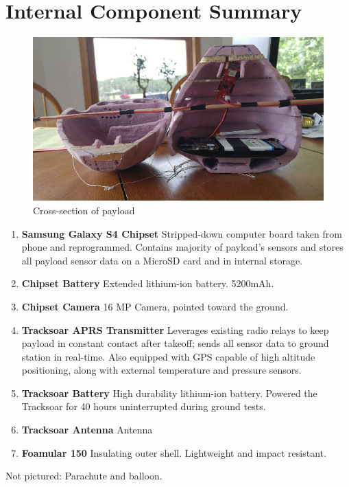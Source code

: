 \documentclass[english]{report}
\begin{document}
\section{Internal Component Summary}
\begin{figure}[H]
\begin{centering}
\includegraphics[scale=0.65]{./images/component-summary}
\par\end{centering}
\caption{Cross-section of payload}
\end{figure}

\begin{multicols}{2}
\begin{enumerate}
\item \textbf{Samsung Galaxy S4 Chipset} Stripped-down computer board taken from phone and reprogrammed.  Contains majority of payload's sensors and stores all payload sensor data on a MicroSD card and in internal storage.
\item \textbf{Chipset Battery} Extended lithium-ion battery.  5200mAh.
\item \textbf{Chipset Camera} 16 MP Camera, pointed toward the ground.
\item \textbf{Tracksoar APRS Transmitter} Leverages existing radio relays
to keep payload in constant contact after takeoff; sends all sensor data to ground station in real-time.  Also equipped with GPS capable of high altitude positioning, along with external temperature and pressure sensors.
\item \textbf{Tracksoar Battery} High durability lithium-ion battery.  Powered the Tracksoar for 40 hours uninterrupted during ground tests.
\item \textbf{Tracksoar Antenna} Antenna
\item \textbf{Foamular 150} Insulating outer shell.  Lightweight and impact resistant.
\end{enumerate}
\end{multicols}
Not pictured: Parachute and balloon.
\end{document}
